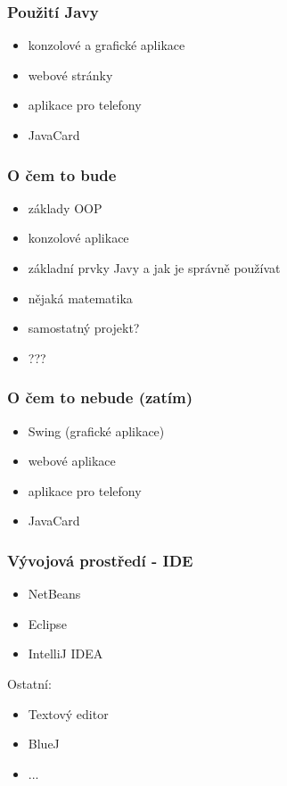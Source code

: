\documentclass[nologo]{slides}
\begin{document}
\begin{frame}
    \frametitle{Použití Javy}

    \begin{itemize}
        \item konzolové a grafické aplikace
        \item webové stránky
        \item aplikace pro telefony
        \item JavaCard
    \end{itemize}

\end{frame}

\begin{frame}
    \frametitle{O čem to bude}

    \begin{itemize}
        \item základy OOP
        \item konzolové aplikace
        \item základní prvky Javy a jak je správně používat
        \item nějaká matematika
        \item samostatný projekt?
        \item ???
    \end{itemize}

\end{frame}

\begin{frame}
    \frametitle{O čem to nebude (zatím)}

    \begin{itemize}
        \item Swing (grafické aplikace)
        \item webové aplikace
        \item aplikace pro telefony
        \item JavaCard
    \end{itemize}

\end{frame}

\begin{frame}
    \frametitle{Vývojová prostředí - IDE}

    \begin{itemize}
        \item NetBeans
        \item Eclipse
        \item IntelliJ IDEA
    \end{itemize}

Ostatní:
    \begin{itemize}
        \item Textový editor
        \item BlueJ
        \item ...
    \end{itemize}

\end{frame}
\end{document}
